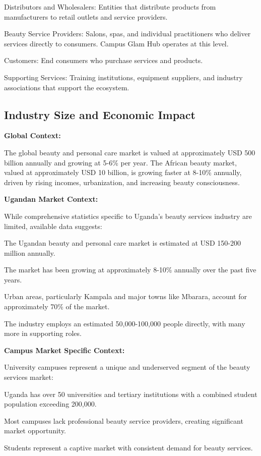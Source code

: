\documentclass[a4paper,12pt]{article}
\begin{document}
Distributors and Wholesalers: Entities that distribute products from manufacturers to retail outlets and service providers.

Beauty Service Providers: Salons, spas, and individual practitioners who deliver services directly to consumers. Campus Glam Hub operates at this level.

Customers: End consumers who purchase services and products.

Supporting Services: Training institutions, equipment suppliers, and industry associations that support the ecosystem.

\subsection{Industry Size and Economic Impact}

\textbf{Global Context:}

The global beauty and personal care market is valued at approximately USD 500 billion annually and growing at 5-6\% per year. The African beauty market, valued at approximately USD 10 billion, is growing faster at 8-10\% annually, driven by rising incomes, urbanization, and increasing beauty consciousness.

\textbf{Ugandan Market Context:}

While comprehensive statistics specific to Uganda's beauty services industry are limited, available data suggests:

The Ugandan beauty and personal care market is estimated at USD 150-200 million annually.

The market has been growing at approximately 8-10\% annually over the past five years.

Urban areas, particularly Kampala and major towns like Mbarara, account for approximately 70\% of the market.

The industry employs an estimated 50,000-100,000 people directly, with many more in supporting roles.

\textbf{Campus Market Specific Context:}

University campuses represent a unique and underserved segment of the beauty services market:

Uganda has over 50 universities and tertiary institutions with a combined student population exceeding 200,000.

Most campuses lack professional beauty service providers, creating significant market opportunity.

Students represent a captive market with consistent demand for beauty services.
\end{document}
